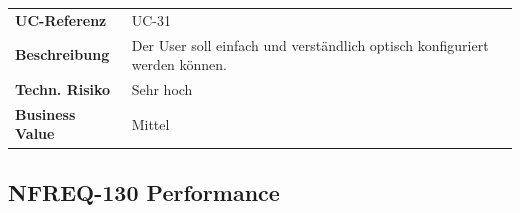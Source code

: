 \begin{longtable}[c]{@{}ll@{}}
\toprule
\begin{minipage}[t]{0.20\columnwidth}\raggedright\strut
\textbf{UC-Referenz}
\strut\end{minipage} &
\begin{minipage}[t]{0.74\columnwidth}\raggedright\strut
UC-31
\strut\end{minipage}\tabularnewline
\begin{minipage}[t]{0.20\columnwidth}\raggedright\strut
\textbf{Beschreibung}
\strut\end{minipage} &
\begin{minipage}[t]{0.74\columnwidth}\raggedright\strut
Der User soll einfach und verständlich optisch konfiguriert werden
können.
\strut\end{minipage}\tabularnewline
\begin{minipage}[t]{0.20\columnwidth}\raggedright\strut
\textbf{Techn. Risiko}
\strut\end{minipage} &
\begin{minipage}[t]{0.74\columnwidth}\raggedright\strut
Sehr hoch
\strut\end{minipage}\tabularnewline
\begin{minipage}[t]{0.20\columnwidth}\raggedright\strut
\textbf{Business Value}
\strut\end{minipage} &
\begin{minipage}[t]{0.74\columnwidth}\raggedright\strut
Mittel
\strut\end{minipage}\tabularnewline
\bottomrule
\end{longtable}

\subsection{NFREQ-130 Performance}\label{nfreq-130-performance}

